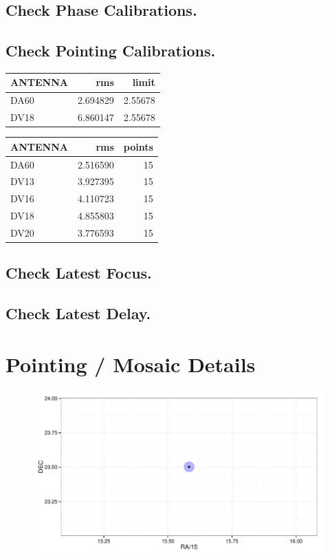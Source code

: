 \documentclass[10pt,]{article}
\begin{document}
\subsection{Check Phase Calibrations.}\label{check-phase-calibrations.}

\subsection{Check Pointing
Calibrations.}\label{check-pointing-calibrations.}

\begin{longtable}[c]{@{}lrr@{}}
\toprule
ANTENNA & rms & limit\tabularnewline
\midrule
\endhead
DA60 & 2.694829 & 2.55678\tabularnewline
DV18 & 6.860147 & 2.55678\tabularnewline
\bottomrule
\end{longtable}

\begin{longtable}[c]{@{}lrr@{}}
\toprule
ANTENNA & rms & points\tabularnewline
\midrule
\endhead
DA60 & 2.516590 & 15\tabularnewline
DV13 & 3.927395 & 15\tabularnewline
DV16 & 4.110723 & 15\tabularnewline
DV18 & 4.855803 & 15\tabularnewline
DV20 & 3.776593 & 15\tabularnewline
\bottomrule
\end{longtable}

\subsection{Check Latest Focus.}\label{check-latest-focus.}

\subsection{Check Latest Delay.}\label{check-latest-delay.}

\pagebreak

\section{Pointing / Mosaic Details}\label{pointing-mosaic-details}

\begin{figure}[htbp]
\centering
\includegraphics{QA0rep_files/figure-latex/unnamed-chunk-6-1.pdf}
\caption{}
\end{figure}
\end{document}
